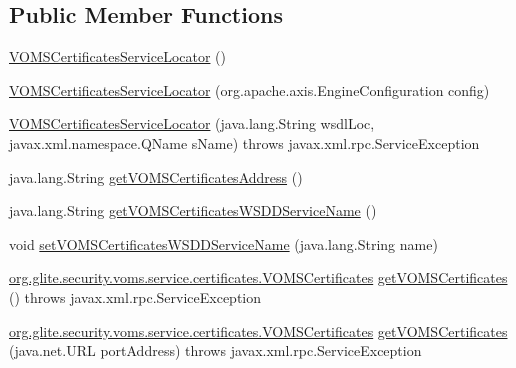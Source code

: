 \subsection*{Public Member Functions}
\begin{DoxyCompactItemize}
\item 
\hyperlink{classorg_1_1glite_1_1security_1_1voms_1_1service_1_1certificates_1_1VOMSCertificatesServiceLocator_a3fc4879c4a51fced2785a0cdfd73e2f6}{VOMSCertificatesServiceLocator} ()
\item 
\hyperlink{classorg_1_1glite_1_1security_1_1voms_1_1service_1_1certificates_1_1VOMSCertificatesServiceLocator_af907200ee08bfd8145e5f3093aac1482}{VOMSCertificatesServiceLocator} (org.apache.axis.EngineConfiguration config)
\item 
\hyperlink{classorg_1_1glite_1_1security_1_1voms_1_1service_1_1certificates_1_1VOMSCertificatesServiceLocator_afb47481fd5cd5aa70edb00bab92b30be}{VOMSCertificatesServiceLocator} (java.lang.String wsdlLoc, javax.xml.namespace.QName sName)  throws javax.xml.rpc.ServiceException 
\item 
java.lang.String \hyperlink{classorg_1_1glite_1_1security_1_1voms_1_1service_1_1certificates_1_1VOMSCertificatesServiceLocator_ad6203c262940257f673f58e36bb4ac43}{getVOMSCertificatesAddress} ()
\item 
java.lang.String \hyperlink{classorg_1_1glite_1_1security_1_1voms_1_1service_1_1certificates_1_1VOMSCertificatesServiceLocator_a426d1a6c0ff4cbaf73efb0e5224d84ad}{getVOMSCertificatesWSDDServiceName} ()
\item 
void \hyperlink{classorg_1_1glite_1_1security_1_1voms_1_1service_1_1certificates_1_1VOMSCertificatesServiceLocator_aa3a80aad280932ebbd9fa9fbd22ebdf8}{setVOMSCertificatesWSDDServiceName} (java.lang.String name)
\item 
\hyperlink{interfaceorg_1_1glite_1_1security_1_1voms_1_1service_1_1certificates_1_1VOMSCertificates}{org.glite.security.voms.service.certificates.VOMSCertificates} \hyperlink{classorg_1_1glite_1_1security_1_1voms_1_1service_1_1certificates_1_1VOMSCertificatesServiceLocator_adcad3b23256f84acba212e60333b93f4}{getVOMSCertificates} ()  throws javax.xml.rpc.ServiceException 
\item 
\hyperlink{interfaceorg_1_1glite_1_1security_1_1voms_1_1service_1_1certificates_1_1VOMSCertificates}{org.glite.security.voms.service.certificates.VOMSCertificates} \hyperlink{classorg_1_1glite_1_1security_1_1voms_1_1service_1_1certificates_1_1VOMSCertificatesServiceLocator_ad0f4cb8aef61e4f619cc174db6063d39}{getVOMSCertificates} (java.net.URL portAddress)  throws javax.xml.rpc.ServiceException 

\end{DoxyCompactItemize}
